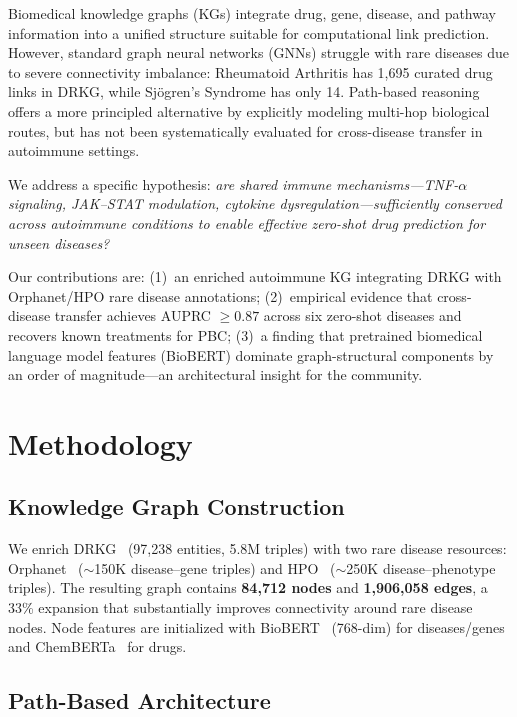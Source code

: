 \documentclass[conference]{IEEEtran}
\begin{document}
Biomedical knowledge graphs (KGs) integrate drug, gene, disease, and pathway information into a unified structure suitable for computational link prediction. However, standard graph neural networks (GNNs) struggle with rare diseases due to severe connectivity imbalance: Rheumatoid Arthritis has 1,695 curated drug links in DRKG, while Sj\"{o}gren's Syndrome has only 14. Path-based reasoning~\cite{nbfnet} offers a more principled alternative by explicitly modeling multi-hop biological routes, but has not been systematically evaluated for cross-disease transfer in autoimmune settings.

We address a specific hypothesis: \textit{are shared immune mechanisms---TNF-$\alpha$ signaling, JAK--STAT modulation, cytokine dysregulation---sufficiently conserved across autoimmune conditions to enable effective zero-shot drug prediction for unseen diseases?}

Our contributions are: (1)~an enriched autoimmune KG integrating DRKG with Orphanet/HPO rare disease annotations; (2)~empirical evidence that cross-disease transfer achieves AUPRC $\geq 0.87$ across six zero-shot diseases and recovers known treatments for PBC; (3)~a finding that pretrained biomedical language model features (BioBERT) dominate graph-structural components by an order of magnitude---an architectural insight for the community.

\section{Methodology}

\subsection{Knowledge Graph Construction}

We enrich DRKG~\cite{drkg} (97,238 entities, 5.8M triples) with two rare disease resources: Orphanet~\cite{orphanet} (${\sim}$150K disease--gene triples) and HPO~\cite{hpo} (${\sim}$250K disease--phenotype triples). The resulting graph contains \textbf{84,712 nodes} and \textbf{1,906,058 edges}, a 33\% expansion that substantially improves connectivity around rare disease nodes. Node features are initialized with BioBERT~\cite{biobert} (768-dim) for diseases/genes and ChemBERTa~\cite{chemberta} for drugs.

\subsection{Path-Based Architecture}
\end{document}
